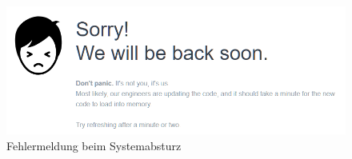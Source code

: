 \begin{figure}
  \centering
  \includegraphics[width=\textwidth]{Bilder/Fehlermeldung.PNG}
  \caption{Fehlermeldung beim Systemabsturz}
  \label{fig:fehlMeldung}
\end{figure}

